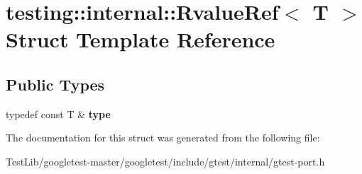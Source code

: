 \hypertarget{structtesting_1_1internal_1_1RvalueRef}{}\section{testing\+:\+:internal\+:\+:Rvalue\+Ref$<$ T $>$ Struct Template Reference}
\label{structtesting_1_1internal_1_1RvalueRef}
\subsection*{Public Types}
\begin{DoxyCompactItemize}
\item 
\mbox{\label{structtesting_1_1internal_1_1RvalueRef_ad09f1fbc87569c7e2837274193097e44}} 
typedef const T \& {\bfseries type}
\end{DoxyCompactItemize}


The documentation for this struct was generated from the following file\+:\begin{DoxyCompactItemize}
\item 
Test\+Lib/googletest-\/master/googletest/include/gtest/internal/gtest-\/port.\+h\end{DoxyCompactItemize}
